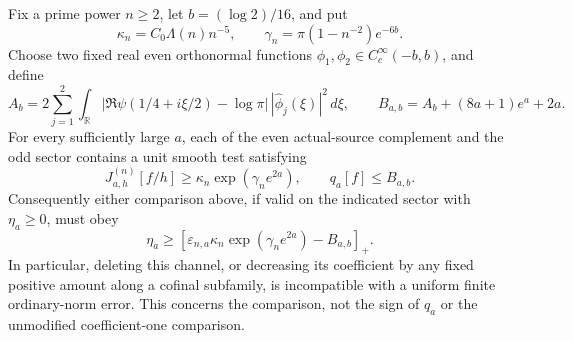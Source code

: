 \begin{proposition}
\label{prop:ns43-fixed-channel}
Fix a prime power $n\ge2$, let $b=(\log2)/16$, and put
\[
 \kappa_n=C_0\Lambda(n)n^{-5},\qquad
 \gamma_n=\pi(1-n^{-2})e^{-6b}.
\]
Choose two fixed real even orthonormal functions
$\phi_1,\phi_2\in C_c^\infty(-b,b)$, and define
\[
 A_b=2\sum_{j=1}^2\int_{\mathbb R}
    |\Re\psi(1/4+i\xi/2)-\log\pi|\,|\widehat\phi_j(\xi)|^2\,d\xi,
 \qquad B_{a,b}=A_b+(8a+1)e^a+2a.
\]
For every sufficiently large $a$, each of the even actual-source
complement and the odd sector contains a unit smooth test satisfying
\[
 J^{(n)}_{a,h}[f/h]\ge\kappa_n\exp(\gamma_n e^{2a}),
 \qquad q_a[f]\le B_{a,b}.
\]
Consequently either comparison above, if valid on the indicated sector
with $\eta_a\ge0$, must obey
\[
 \eta_a\ge
 [\varepsilon_{n,a}\kappa_n\exp(\gamma_n e^{2a})-B_{a,b}]_+.
\]
In particular, deleting this channel, or decreasing its coefficient by
any fixed positive amount along a cofinal subfamily, is incompatible
with a uniform finite ordinary-norm error. This concerns the comparison,
not the sign of $q_a$ or the unmodified coefficient-one comparison.
\end{proposition}
